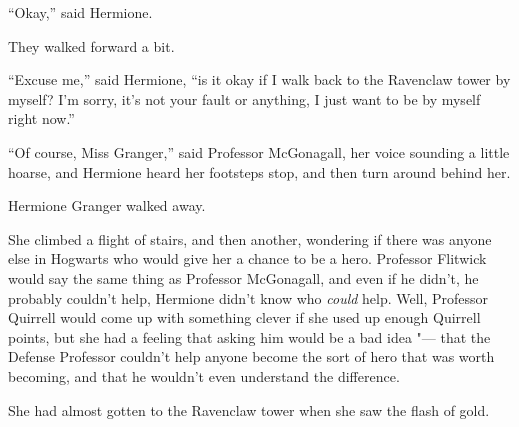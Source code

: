 ``Okay,'' said Hermione.

They walked forward a bit.

``Excuse me,'' said Hermione, ``is it okay if I walk back to the
Ravenclaw tower by myself? I'm sorry, it's not your fault or anything, I
just want to be by myself right now.''

``Of course, Miss Granger,'' said Professor McGonagall, her voice
sounding a little hoarse, and Hermione heard her footsteps stop, and
then turn around behind her.

Hermione Granger walked away.

She climbed a flight of stairs, and then another, wondering if there was
anyone else in Hogwarts who would give her a chance to be a hero.
Professor Flitwick would say the same thing as Professor McGonagall, and
even if he didn't, he probably couldn't help, Hermione didn't know who
\emph{could} help. Well, Professor Quirrell would come up with something
clever if she used up enough Quirrell points, but she had a feeling that
asking him would be a bad idea "--- that the Defense Professor couldn't
help anyone become the sort of hero that was worth becoming, and that he
wouldn't even understand the difference.

She had almost gotten to the Ravenclaw tower when she saw the flash of
gold.
